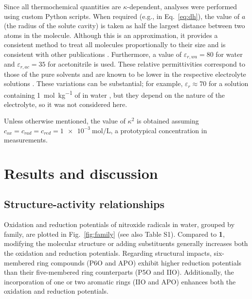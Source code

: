 \documentclass[review,preprint]{elsarticle}
\begin{document}
Since all thermochemical quantities are $\kappa$-dependent, analyses were performed using custom Python scripts. When required (e.g., in Eq.~\eqref{eq:dh}), the value of $a$ (the radius of the solute cavity) is taken as half the largest distance between two atoms in the molecule. Although this is an approximation, it provides a consistent method to treat all molecules proportionally to their size and is consistent with other publications \cite{matsuiDensityFunctionalTheory2013}.  Furthermore, a value of $\varepsilon_{r,wa}=80$ for water and $\varepsilon_{r,ac}=35$ for acetonitrile is used. These relative permittivities correspond to those of the pure solvents and are known to be lower in the respective electrolyte solutions \cite{silvaTrueHuckelEquation2022}. These variations can be substantial; for example, $\varepsilon_r \approx 70$ for a solution containing \SI{1}{\mol\per\kilo\gram} of  in water \cite{kontogeorgisDebyeHuckelTheoryIts2018, silvaTrueHuckelEquation2022}, but they depend on the nature of the electrolyte, so it was not considered here.


Unless otherwise mentioned, the value of $\kappa^2$ is obtained assuming  $c_{ox} = c_{rad} = c_ {red} = \SI{1e-3}{\mole\per\liter}$, a prototypical concentration in measurements.


\section{Results and discussion} \label{sec:results}

\subsection{Structure-activity relationships} \label{sec:sar}


Oxidation and reduction potentials of nitroxide radicals in water, grouped by family, are plotted in Fig.~\ref{fig:family} (see also Table S1). Compared to \textbf{1}, modifying the molecular structure or adding substituents generally increases both the oxidation and reduction potentials. Regarding structural impacts, six-membered ring compounds (P6O and APO) exhibit higher reduction potentials than their five-membered ring counterparts (P5O and IIO). Additionally, the incorporation of one or two aromatic rings (IIO and APO) enhances both the oxidation and reduction potentials.
\end{document}
